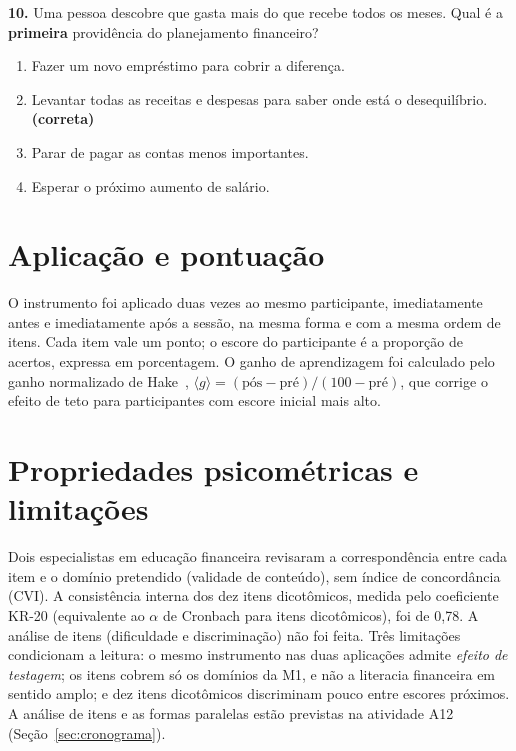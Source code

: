 \vspace{0.3cm}
\noindent\textbf{10.} Uma pessoa descobre que gasta mais do que recebe todos os meses. Qual é a
\textbf{primeira} providência do planejamento financeiro?
\begin{enumerate}
    \item[(a)] Fazer um novo empréstimo para cobrir a diferença.
    \item[(b)] Levantar todas as receitas e despesas para saber onde está o desequilíbrio. \textbf{(correta)}
    \item[(c)] Parar de pagar as contas menos importantes.
    \item[(d)] Esperar o próximo aumento de salário.
\end{enumerate}

\section*{Aplicação e pontuação}

O instrumento foi aplicado duas vezes ao mesmo participante, imediatamente antes e
imediatamente após a sessão, na mesma forma e com a mesma ordem de itens. Cada item vale um
ponto; o escore do participante é a proporção de acertos, expressa em porcentagem. O ganho de
aprendizagem foi calculado pelo ganho normalizado de Hake~\cite{hake1998interactive},
$\langle g \rangle = (\text{pós} - \text{pré}) / (100 - \text{pré})$, que corrige o efeito de
teto para participantes com escore inicial mais alto.

\section*{Propriedades psicométricas e limitações}

Dois especialistas em educação financeira revisaram a correspondência entre cada item e o
domínio pretendido (validade de conteúdo), sem índice de concordância (CVI). A consistência
interna dos dez itens dicotômicos, medida pelo coeficiente KR-20 (equivalente ao $\alpha$ de
Cronbach para itens dicotômicos), foi de 0,78. A análise de itens (dificuldade e discriminação)
não foi feita. Três limitações condicionam a leitura: o mesmo instrumento nas duas aplicações
admite \emph{efeito de testagem}; os itens cobrem só os domínios da M1, e não a literacia
financeira em sentido amplo; e dez itens dicotômicos discriminam pouco entre escores próximos.
A análise de itens e as formas paralelas estão previstas na atividade A12
(Seção~\ref{sec:cronograma}).

